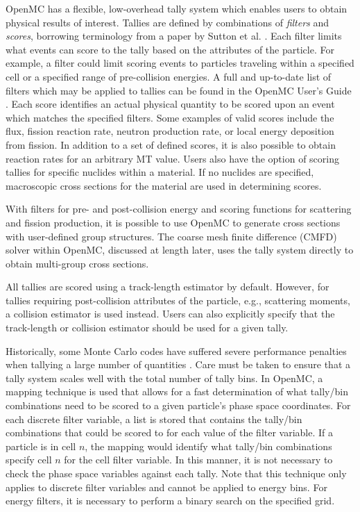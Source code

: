 \documentclass[5p,authoryear]{elsarticle}
\begin{document}
OpenMC has a flexible, low-overhead tally system which enables users to obtain
physical results of interest. Tallies are defined by combinations of
\textit{filters} and \textit{scores}, borrowing terminology from a paper by
Sutton et al. \citep{mc-sutton-2007}. Each filter limits what events can score to
the tally based on the attributes of the particle. For example, a filter could
limit scoring events to particles traveling within a specified cell or a
specified range of pre-collision energies. A full and up-to-date list of filters
which may be applied to tallies can be found in the OpenMC User's Guide
\citep{romano-2013-doc}. Each score identifies an actual physical quantity to be
scored upon an event which matches the specified filters. Some examples of valid
scores include the flux, fission reaction rate, neutron production rate, or
local energy deposition from fission. In addition to a set of defined scores, it
is also possible to obtain reaction rates for an arbitrary MT value. Users also
have the option of scoring tallies for specific nuclides within a material. If
no nuclides are specified, macroscopic cross sections for the material are used
in determining scores.

With filters for pre- and post-collision energy and scoring functions for
scattering and fission production, it is possible to use OpenMC to generate
cross sections with user-defined group structures. The coarse mesh finite
difference (CMFD) solver within OpenMC, discussed at length later, uses the
tally system directly to obtain multi-group cross sections.

All tallies are scored using a track-length estimator by default. However, for
tallies requiring post-collision attributes of the particle, e.g., scattering
moments, a collision estimator is used instead. Users can also explicitly
specify that the track-length or collision estimator should be used for a given
tally.

Historically, some Monte Carlo codes have suffered severe performance penalties
when tallying a large number of quantities \citep{pnst-vanveen-2011}. Care must
be taken to ensure that a tally system scales well with the total number of
tally bins. In OpenMC, a mapping technique is used that allows for a fast
determination of what tally/bin combinations need to be scored to a given
particle's phase space coordinates. For each discrete filter variable, a list is
stored that contains the tally/bin combinations that could be scored to for each
value of the filter variable. If a particle is in cell $n$, the mapping would
identify what tally/bin combinations specify cell $n$ for the cell filter
variable. In this manner, it is not necessary to check the phase space variables
against each tally. Note that this technique only applies to discrete filter
variables and cannot be applied to energy bins. For energy filters, it is
necessary to perform a binary search on the specified grid.
\end{document}
